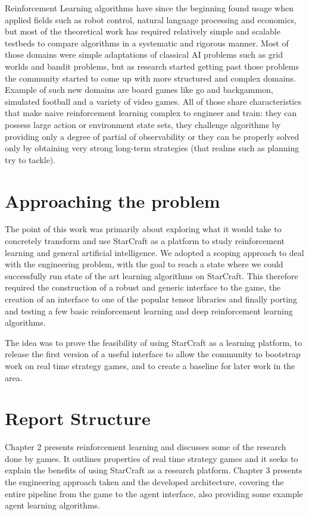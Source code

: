Reinforcement Learning algorithms have since the beginning found usage when
applied fields such as robot control, natural language processing and economics,
but most of the theoretical work has required relatively simple and scalable
testbeds to compare algorithms in a systematic and rigorous manner. Most of
those domains were simple adaptations of classical AI problems such as grid
worlds and bandit problems, but as research started getting past those problems
the community started to come up with more structured and complex domains.
Example of such new domains are board games like go and backgammon, simulated
football and a variety of video games. All of those share characteristics that
make naive reinforcement learning complex to engineer and train: they can
possess large action or environment state sets, they challenge algorithms by
providing only a degree of partial of observability or they can be properly
solved only by obtaining very strong long-term strategies (that realms such as
planning try to tackle).






\section{Approaching the problem} %

The point of this work was primarily about exploring what it would take to
concretely transform and use StarCraft as a platform to study reinforcement
learning and general artificial intelligence. We adopted a scoping approach to
deal with the engineering problem, with the goal to reach a state where we could
successfully run state of the art learning algorithms on StarCraft. This
therefore required the construction of a robust and generic interface to the
game, the creation of an interface to one of the popular tensor libraries and
finally porting and testing a few basic reinforcement learning and deep
reinforcement learning algorithms.

The idea was to prove the feasibility of using StarCraft as a learning platform,
to release the first version of a useful interface to allow the community to
bootstrap work on real time strategy games, and to create a baseline for later
work in the area.

\section{Report Structure}

Chapter 2 presents reinforcement learning and discusses some of the research
done by games. It outlines properties of real time strategy games and it seeks
to explain the benefits of using StarCraft as a research platform. Chapter 3
presents the engineering approach taken and the developed architecture, covering
the entire pipeline from the game to the agent interface, also providing some
example agent learning algorithms.
